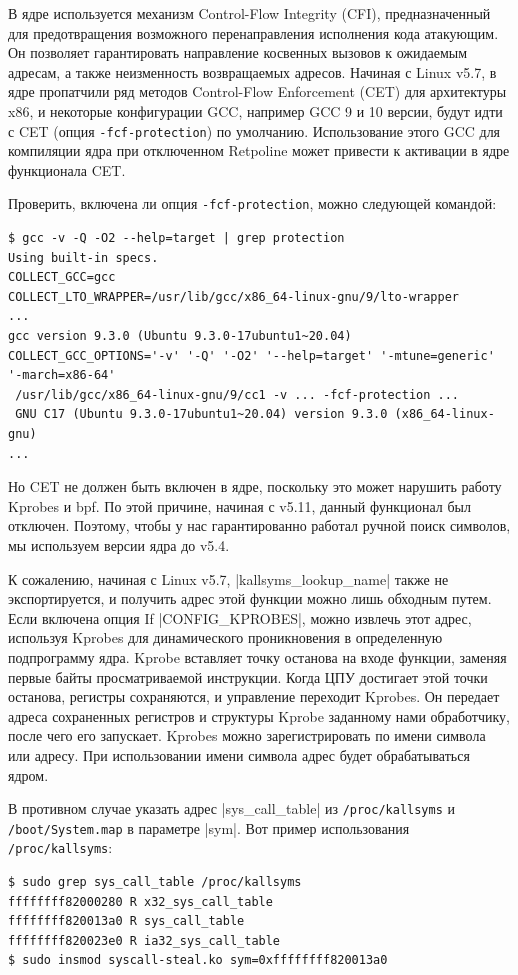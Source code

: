 \documentclass[10pt, oneside]{book}
\begin{document}
В ядре используется механизм Control-Flow Integrity (CFI), предназначенный для предотвращения возможного перенаправления исполнения кода атакующим. Он
позволяет гарантировать направление косвенных вызовов к ожидаемым адресам, а также неизменность возвращаемых адресов. Начиная с Linux v5.7, в ядре пропатчили ряд методов Control-Flow Enforcement (CET) для архитектуры x86, и некоторые конфигурации GCC, например GCC 9 и 10 версии, будут идти с CET (опция \verb|-fcf-protection|) по умолчанию. Использование этого GCC для компиляции ядра при отключенном Retpoline может привести к активации в ядре функционала CET.

Проверить, включена ли опция \verb|-fcf-protection|, можно следующей командой:
\begin{verbatim}
$ gcc -v -Q -O2 --help=target | grep protection
Using built-in specs.
COLLECT_GCC=gcc
COLLECT_LTO_WRAPPER=/usr/lib/gcc/x86_64-linux-gnu/9/lto-wrapper
...
gcc version 9.3.0 (Ubuntu 9.3.0-17ubuntu1~20.04)
COLLECT_GCC_OPTIONS='-v' '-Q' '-O2' '--help=target' '-mtune=generic' '-march=x86-64'
 /usr/lib/gcc/x86_64-linux-gnu/9/cc1 -v ... -fcf-protection ...
 GNU C17 (Ubuntu 9.3.0-17ubuntu1~20.04) version 9.3.0 (x86_64-linux-gnu)
...
\end{verbatim}
Но CET не должен быть включен в ядре, поскольку это может нарушить работу Kprobes и bpf. По этой причине, начиная с v5.11, данный функционал был отключен. Поэтому, чтобы у нас гарантированно работал ручной поиск символов, мы используем версии ядра до v5.4.

К сожалению, начиная с Linux v5.7, \cpp|kallsyms_lookup_name| также не экспортируется, и получить адрес этой функции можно лишь обходным путем. Если включена опция If \cpp|CONFIG_KPROBES|, можно извлечь этот адрес, используя Kprobes для динамического проникновения в определенную подпрограмму ядра. Kprobe вставляет точку останова на входе функции, заменяя первые байты просматриваемой инструкции. Когда ЦПУ достигает этой точки останова, регистры сохраняются, и управление переходит Kprobes. Он передает адреса сохраненных регистров и структуры Kprobe заданному нами обработчику, после чего его запускает. Kprobes можно зарегистрировать по имени символа или адресу. При использовании имени символа адрес будет обрабатываться ядром.

В противном случае указать адрес \cpp|sys_call_table| из \verb|/proc/kallsyms| и \verb|/boot/System.map| в параметре \cpp|sym|.
Вот пример использования \verb|/proc/kallsyms|:
\begin{verbatim}
$ sudo grep sys_call_table /proc/kallsyms
ffffffff82000280 R x32_sys_call_table
ffffffff820013a0 R sys_call_table
ffffffff820023e0 R ia32_sys_call_table
$ sudo insmod syscall-steal.ko sym=0xffffffff820013a0
\end{verbatim}
\end{document}
